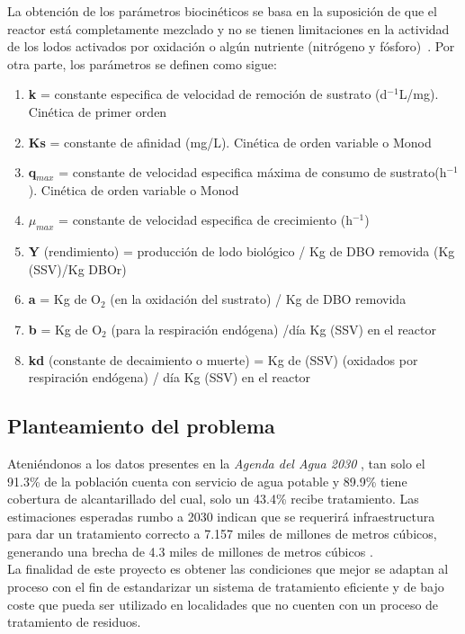 La obtención de los parámetros biocinéticos se basa en la suposición de que el reactor está completamente mezclado y no se tienen limitaciones en la actividad de los lodos activados por oxidación o algún nutriente (nitrógeno y fósforo)~\emph{\citep{martinez2005}}. Por otra parte, los parámetros se definen como sigue:
	\begin{small}	
	\begin{enumerate}[·]
	\item \textbf{k} = constante especifica de velocidad de remoción de sustrato (d$^{-1}$L/mg). Cinética de primer orden
	\item \textbf{Ks} = constante de afinidad (mg/L). Cinética de orden variable o Monod
	\item \textbf{q$_{max}$} = constante de velocidad especifica máxima de consumo de sustrato(h$^{-1}$). Cinética de orden variable o Monod
	\item \textbf{$\mu_{max}$} = constante de velocidad especifica de crecimiento (h$^{-1}$)
	\item \textbf{Y} (rendimiento) = producción de lodo biológico / Kg de DBO removida (Kg (SSV)/Kg DBOr)
	\item \textbf{a} = Kg de O$_{2}$ (en la oxidación del sustrato) / Kg de DBO removida
	\item \textbf{b} = Kg de O$_{2}$ (para la respiración endógena) /día Kg (SSV) en el reactor
	\item \textbf{kd} (constante de decaimiento o muerte) = Kg de (SSV) (oxidados por respiración endógena) / día Kg (SSV) en el reactor
	\end{enumerate}
	\end{small}
\subsection*{Planteamiento del problema}
Ateniéndonos a los datos presentes en la \emph{Agenda del Agua 2030} \emph{\citep{aa2030}}, tan solo el 91.3\% de la población cuenta con servicio de agua potable y 89.9\% tiene cobertura de alcantarillado del cual, solo un 43.4\% recibe tratamiento. Las estimaciones esperadas rumbo a 2030 indican que se requerirá infraestructura para dar un tratamiento correcto a 7.157 miles de millones de metros cúbicos, generando una brecha de 4.3 miles de millones de metros cúbicos \emph{\citep{aa2030}}.\\
La finalidad de este proyecto es obtener las condiciones que mejor se adaptan al proceso con el fin de estandarizar un sistema de tratamiento eficiente y de bajo coste que pueda ser utilizado en localidades que no cuenten con un proceso de tratamiento de residuos.
